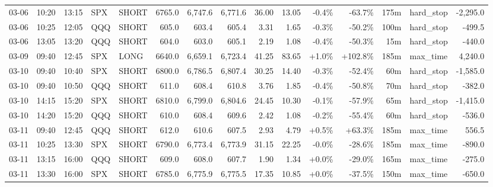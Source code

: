 \documentclass[11pt,a4paper,twoside]{article}
\begin{document}
\begin{landscape}
\begin{center}
\begin{longtable}{>{\color{txtmain}}l l l l l r r r r r r r r >{\color{txtmain}}l r}
03-06 & 10:20 & 13:15 & SPX & SHORT & 6765.0 & 6,747.6 & 6,771.6 & 36.00 & 13.05 & \textcolor{lossred}{-0.4\%} & \textcolor{lossred}{-63.7\%} & 175m & hard\_stop & \textcolor{lossred}{-2,295.0} \\
03-06 & 10:25 & 12:05 & QQQ & SHORT & 605.0 & 603.4 & 605.4 & 3.31 & 1.65 & \textcolor{lossred}{-0.3\%} & \textcolor{lossred}{-50.2\%} & 100m & hard\_stop & \textcolor{lossred}{-499.5} \\
03-06 & 13:05 & 13:20 & QQQ & SHORT & 604.0 & 603.0 & 605.1 & 2.19 & 1.08 & \textcolor{lossred}{-0.4\%} & \textcolor{lossred}{-50.3\%} & 15m & hard\_stop & \textcolor{lossred}{-440.0} \\
03-09 & 09:40 & 12:45 & SPX & LONG & 6640.0 & 6,659.1 & 6,723.4 & 41.25 & 83.65 & \textcolor{wingreen}{+1.0\%} & \textcolor{wingreen}{+102.8\%} & 185m & max\_time & \textcolor{wingreen}{4,240.0} \\
03-10 & 09:40 & 10:40 & SPX & SHORT & 6800.0 & 6,786.5 & 6,807.4 & 30.25 & 14.40 & \textcolor{lossred}{-0.3\%} & \textcolor{lossred}{-52.4\%} & 60m & hard\_stop & \textcolor{lossred}{-1,585.0} \\
03-10 & 09:40 & 10:50 & QQQ & SHORT & 611.0 & 608.4 & 610.8 & 3.76 & 1.85 & \textcolor{lossred}{-0.4\%} & \textcolor{lossred}{-50.8\%} & 70m & hard\_stop & \textcolor{lossred}{-382.0} \\
03-10 & 14:15 & 15:20 & SPX & SHORT & 6810.0 & 6,799.0 & 6,804.6 & 24.45 & 10.30 & \textcolor{lossred}{-0.1\%} & \textcolor{lossred}{-57.9\%} & 65m & hard\_stop & \textcolor{lossred}{-1,415.0} \\
03-10 & 14:20 & 15:20 & QQQ & SHORT & 610.0 & 608.4 & 609.6 & 2.42 & 1.08 & \textcolor{lossred}{-0.2\%} & \textcolor{lossred}{-55.4\%} & 60m & hard\_stop & \textcolor{lossred}{-536.0} \\
03-11 & 09:40 & 12:45 & QQQ & SHORT & 612.0 & 610.6 & 607.5 & 2.93 & 4.79 & \textcolor{wingreen}{+0.5\%} & \textcolor{wingreen}{+63.3\%} & 185m & max\_time & \textcolor{wingreen}{556.5} \\
03-11 & 10:25 & 13:30 & SPX & SHORT & 6790.0 & 6,773.4 & 6,773.9 & 31.15 & 22.25 & \textcolor{lossred}{-0.0\%} & \textcolor{lossred}{-28.6\%} & 185m & max\_time & \textcolor{lossred}{-890.0} \\
03-11 & 13:15 & 16:00 & QQQ & SHORT & 609.0 & 608.0 & 607.7 & 1.90 & 1.34 & \textcolor{wingreen}{+0.0\%} & \textcolor{lossred}{-29.0\%} & 165m & max\_time & \textcolor{lossred}{-275.0} \\
03-11 & 13:30 & 16:00 & SPX & SHORT & 6785.0 & 6,775.9 & 6,775.5 & 17.35 & 10.85 & \textcolor{wingreen}{+0.0\%} & \textcolor{lossred}{-37.5\%} & 150m & max\_time & \textcolor{lossred}{-650.0} \\

\end{longtable}
\end{center}
\end{landscape}
\end{document}

